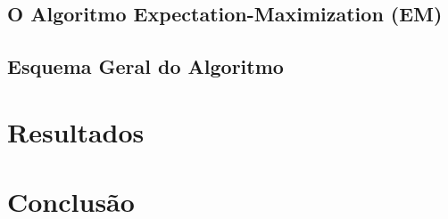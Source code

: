 \documentclass[12pt]{article}
\begin{document}
\subsection{O Algoritmo Expectation-Maximization (EM)}


\subsection{Esquema Geral do Algoritmo}


\section{Resultados}


\section{Conclusão}


\printbibliography
\end{document}
